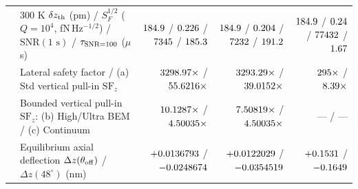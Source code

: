 \begin{table}[!htbp]
{\begin{tabular}{llrrr}
 & 300 K $\delta z_{\rm th}$ (pm) / $S_F^{1/2}$ ($Q=10^4$, fN\,Hz$^{-1/2}$) / $\mathrm{SNR}(1\text{ s})$ / $\tau_{\rm SNR=100}$ ($\mu$s) & $\roundone{\NatureCantorNtwoHybridrzThermalDzRegimeOnePm}$ / $\roundthree{\NatureCantorNtwoHybridrzSfSqrtRegoneQoneefourFn}$ / $\roundzero{\NatureCantorNtwoHybridrzSnrOneSec}$ / $\roundone{\NatureCantorNtwoHybridrzTauSnronezerozeroRegoneQoneefourUs}$ & $\roundone{\NatureRotCeightCompactNtwoThermalDzRegimeOnePm}$ / $\roundthree{\NatureRotCeightCompactNtwoSfSqrtRegoneQoneefourFn}$ / $\roundzero{\NatureRotCeightCompactNtwoSnrOneSec}$ / $\roundone{\NatureRotCeightCompactNtwoTauSnronezerozeroRegoneQoneefourUs}$ & $\roundone{\NatureCantorNtwoHybridrzThermalDzRegimeOnePm}$ / $\roundthree{\NatureFthreeOneoneoneSFSqrtFnPerRthzQoneefour}$ / $\roundzero{\NatureFthreeOneoneoneSnrOneSecQoneefour}$ / $\roundtwo{\NatureFthreeOneoneoneTauSnronezerozeroRegoneQoneefourUs}$ \\
 & Lateral safety factor / (a) Std vertical pull-in $\text{SF}_z$ & $3298.97{}\times$ / $55.6216{}\times$ & $3293.29{}\times$ / $39.0152{}\times$ & $\roundzero{\NatureFthreeOneoneoneRegoneLateralStabilitySafetyFactor}\times$ / $\roundtwo{\NatureFthreeOneoneoneRegoneVerticalPullInSafetyFactor}\times$ \\
 & Bounded vertical pull-in $\text{SF}_z$: (b) High/Ultra BEM / (c) Continuum & $10.1287{}\times$ / $4.50035{}\times$ & $7.50819{}\times$ / $4.50035{}\times$ & --- / --- \\
 & Equilibrium axial deflection $\Delta z(\theta_{\rm off})$ / $\Delta z(48^\circ)$ (nm) & $+0.0136793{}$ / $-0.0248674{}$ & $+0.0122029{}$ / $-0.0354519{}$ & $+\roundfour{\NatureFthreeOneoneoneRegoneEquilibriumAxialRepulsiveLiftNm}$ / $\roundfour{\NatureFthreeOneoneoneRegoneEngagedLinearAxialDeflectionNm}$ \\

\end{tabular}}
\end{table}
